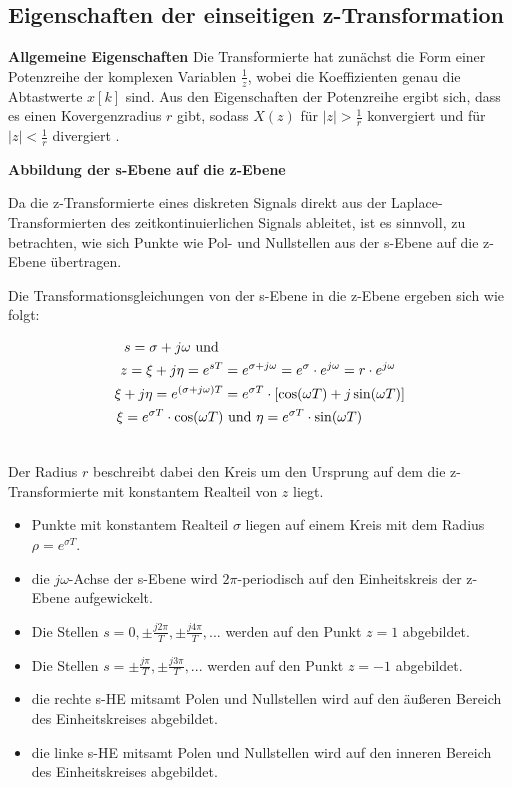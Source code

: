 \addvspace{1cm}
\subsection{Eigenschaften der einseitigen z-Transformation}

\textbf{Allgemeine Eigenschaften}
Die Transformierte hat zunächst die Form einer Potenzreihe der komplexen Variablen $\frac{1}{z}$, wobei die Koeffizienten genau die Abtastwerte $x[k]$ sind. 
Aus den Eigenschaften der Potenzreihe ergibt sich, dass es einen Kovergenzradius $r$ gibt, sodass $X(z)$ für $|z|>\frac{1}{r}$ konvergiert und für $|z|<\frac{1}{r}$ divergiert \cite[S.233]{book2}.

\addvspace{5cm}
\textbf{Abbildung der s-Ebene auf die z-Ebene}

Da die z-Transformierte eines diskreten Signals direkt aus der Laplace-Transformierten des zeitkontinuierlichen Signals ableitet, ist es sinnvoll, zu betrachten, wie sich Punkte wie Pol- und Nullstellen aus der s-Ebene auf die z-Ebene übertragen.

Die Transformationsgleichungen von der s-Ebene in die z-Ebene ergeben sich wie folgt:

\begin{align}
    \notag
    s = \sigma + j \omega \text{ und }& \\
    \notag
    z = \xi + j \eta  = e^{sT}& = e^{\sigma + j \omega} = e^{\sigma} \cdot e^{j \omega} = r \cdot e^{j \omega}\\
     \notag
    \xi + j \eta = e^{(\sigma + j \omega)T} & = e^{\sigma T} \cdot [\cos(\omega T) + j \sin(\omega T)] \\
     \notag
    \xi = e^{\sigma T} \cdot \cos(\omega T) &\text{ und } \eta = e^{\sigma T} \cdot \sin(\omega T) \\
     \notag
\end{align}

Der Radius $r$ beschreibt dabei den Kreis um den Ursprung auf dem die z-Transformierte mit konstantem Realteil von $z$ liegt.

\begin{itemize}
    \item Punkte mit konstantem Realteil $\sigma$ liegen auf einem Kreis mit dem Radius $\rho=e^{\sigma T}$.
    \item die $j \omega$-Achse der s-Ebene wird $2\pi$-periodisch auf den Einheitskreis der z-Ebene aufgewickelt.
    \item Die Stellen $s = 0,\pm \frac{j2\pi}{T},\pm \frac{j4\pi}{T},...$ werden auf den Punkt $z=1$ abgebildet.
    \item Die Stellen $s = \pm \frac{j\pi}{T},\pm \frac{j3\pi}{T},...$ werden auf den Punkt $z=-1$ abgebildet.
    \item die rechte s-HE mitsamt Polen und Nullstellen wird auf den äußeren Bereich des Einheitskreises abgebildet.
    \item die linke s-HE mitsamt Polen und Nullstellen wird auf den inneren Bereich des Einheitskreises abgebildet.
\end{itemize}
\cite[S.234]{book2}

